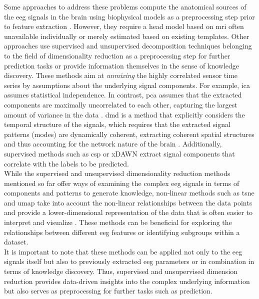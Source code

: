 Some approaches to address these problems compute the anatomical sources of the \gls{eeg} signals in the brain using biophysical models as a preprocessing step prior to feature extraction \cite{Khan2018, Westner2018}. However, they require a head model based on \gls{mri} often unavailable individually or merely estimated based on existing templates. Other approaches use supervised and unsupervised decomposition techniques belonging to the field of dimensionality reduction as a preprocessing step for further prediction tasks or provide information themselves in the sense of knowledge discovery. These methods aim at \textit{unmixing} the highly correlated sensor time series by assumptions about the underlying signal components. For example, \gls{ica} assumes statistical independence. In contrast, \gls{pca} assumes that the extracted components are maximally uncorrelated to each other, capturing the largest amount of variance in the data \cite{CohenX2017}. \Gls{dmd} is a method that explicitly considers the temporal structure of the signals, which requires that the extracted signal patterns (modes) are dynamically coherent, extracting coherent spatial structures and thus accounting for the network nature of the brain \cite{Brunton2016}. Additionally, supervised methods such as \gls{csp} \cite{Blankertz2008} or xDAWN \cite{Rivet2009} extract signal components that correlate with the labels to be predicted.\\
While the supervised and unsupervised dimensionality reduction methods mentioned so far offer ways of examining the complex \gls{eeg} signals in terms of components and patterns to generate knowledge, non-linear methods such as \gls{tsne} and \gls{umap} take into account the non-linear relationships between the data points and provide a lower-dimensional representation of the data that is often easier to interpret and visualize \cite{Mcinnes2018}. These methods can be beneficial for exploring the relationships between different \gls{eeg} features or identifying subgroups within a dataset.\\
It is important to note that these methods can be applied not only to the \gls{eeg} signals itself but also to previously extracted \gls{eeg} parameters or in combination in terms of knowledge discovery. Thus, supervised and unsupervised dimension reduction provides data-driven insights into the complex underlying information but also serves as preprocessing for further tasks such as prediction.

